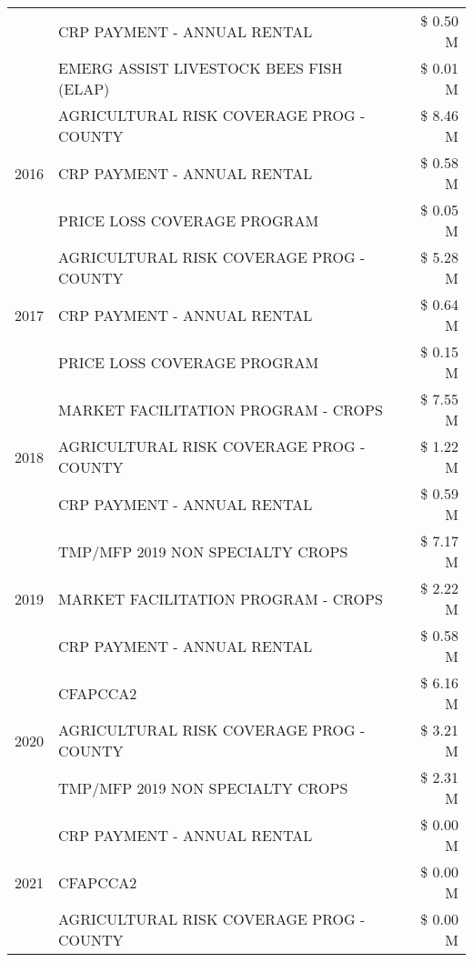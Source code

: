 \begin{tabular}{llr}
 & CRP PAYMENT - ANNUAL RENTAL & \$ 0.50 M \\
 & EMERG ASSIST LIVESTOCK BEES FISH (ELAP) & \$ 0.01 M \\
\cline{1-3}
\multirow[t]{3}{*}{2016} & AGRICULTURAL RISK COVERAGE PROG - COUNTY & \$ 8.46 M \\
 & CRP PAYMENT - ANNUAL RENTAL & \$ 0.58 M \\
 & PRICE LOSS COVERAGE PROGRAM & \$ 0.05 M \\
\cline{1-3}
\multirow[t]{3}{*}{2017} & AGRICULTURAL RISK COVERAGE PROG - COUNTY & \$ 5.28 M \\
 & CRP PAYMENT - ANNUAL RENTAL & \$ 0.64 M \\
 & PRICE LOSS COVERAGE PROGRAM & \$ 0.15 M \\
\cline{1-3}
\multirow[t]{3}{*}{2018} & MARKET FACILITATION PROGRAM - CROPS & \$ 7.55 M \\
 & AGRICULTURAL RISK COVERAGE PROG - COUNTY & \$ 1.22 M \\
 & CRP PAYMENT - ANNUAL RENTAL & \$ 0.59 M \\
\cline{1-3}
\multirow[t]{3}{*}{2019} & TMP/MFP 2019 NON SPECIALTY CROPS & \$ 7.17 M \\
 & MARKET FACILITATION PROGRAM - CROPS & \$ 2.22 M \\
 & CRP PAYMENT - ANNUAL RENTAL & \$ 0.58 M \\
\cline{1-3}
\multirow[t]{3}{*}{2020} & CFAPCCA2 & \$ 6.16 M \\
 & AGRICULTURAL RISK COVERAGE PROG - COUNTY & \$ 3.21 M \\
 & TMP/MFP 2019 NON SPECIALTY CROPS & \$ 2.31 M \\
\cline{1-3}
\multirow[t]{3}{*}{2021} & CRP PAYMENT - ANNUAL RENTAL & \$ 0.00 M \\
 & CFAPCCA2 & \$ 0.00 M \\
 & AGRICULTURAL RISK COVERAGE PROG - COUNTY & \$ 0.00 M \\
\cline{1-3}
\bottomrule
\end{tabular}

